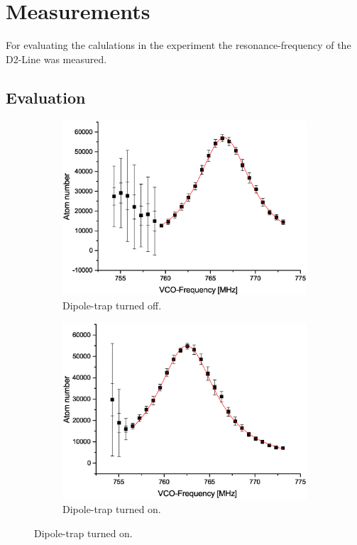 \chapter{Measurements}
For evaluating the calulations in the experiment the resonance-frequency of the D2-Line was measured. 



\section{Evaluation}
\begin{figure}[H]
\centering
\begin{subfigure}[b]{0.48\textwidth}
                \includegraphics[width=\textwidth]{withoutodt}
                \caption{Dipole-trap turned off.}
\end{subfigure}
\begin{subfigure}[b]{0.48\textwidth}
               \includegraphics[width=\textwidth]{withodt}
                \caption{Dipole-trap turned on.}
\end{subfigure}



\end{figure}
